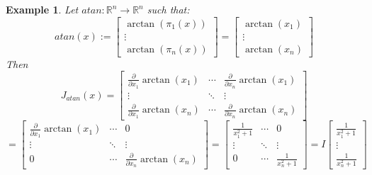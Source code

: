 \documentclass[12pt]{extarticle}
\theoremstyle{plain}
\theoremstyle{Definition}
\theoremstyle{Definition}
\theoremstyle{plain}
\newtheorem{exmp}{Example}[section]
\begin{document}
\begin{exmp} 
	Let $atan : \mathbb{R}^n \to \mathbb{R}^n$ such that:
	\[
	atan(x) := 
	\begin{bmatrix}
	\arctan(\pi_1(x)) \\ 
	\vdots \\ 
	\arctan(\pi_n(x))
	\end{bmatrix}
	= 
	\begin{bmatrix}
	\arctan(x_1) \\ 
	\vdots \\ 
	\arctan(x_n)
	\end{bmatrix}
	\]
	Then
	\[
	J_{atan}(x) = 
	\begin{bmatrix} 
	\frac{\partial}{\partial x_1}\arctan(x_1) & \cdots & \frac{\partial}{\partial x_n}\arctan(x_1) \\
	\vdots & \ddots & \vdots \\ 
	\frac{\partial }{\partial x_1}\arctan(x_n) & \cdots & \frac{\partial }{\partial x_n}\arctan(x_n) 
	\end{bmatrix}	
	\]
	\[
	=
	\begin{bmatrix} 
	\frac{\partial}{\partial x_1}\arctan(x_1) & \cdots & 0 \\
	\vdots & \ddots & \vdots \\ 
	0 & \cdots & \frac{\partial }{\partial x_n}\arctan(x_n) 
	\end{bmatrix}								
	=
	\begin{bmatrix} 
	\frac{1}{x_1^2 + 1} & \cdots & 0 \\
	\vdots & \ddots & \vdots \\ 
	0 & \cdots & \frac{1}{x_n^2 + 1} 
	\end{bmatrix}								
	= I \begin{bmatrix}
	\frac{1}{x_1^2 + 1} \\ 
	\vdots \\
	\frac{1}{x_n^2 + 1}
	\end{bmatrix}
	\]
\end{exmp}
\end{document}
